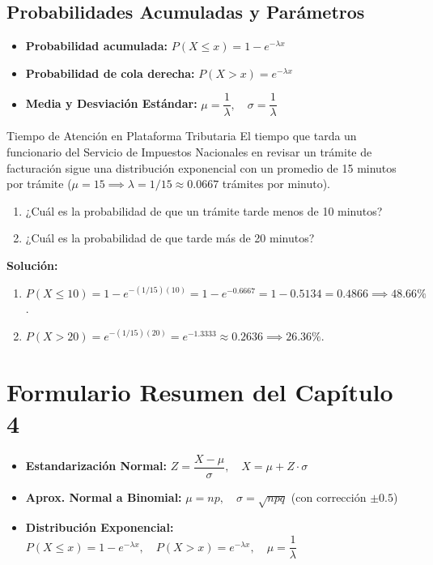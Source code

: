 \subsection{Probabilidades Acumuladas y Parámetros}
\begin{itemize}
    \item \textbf{Probabilidad acumulada:} $P(X \le x) = 1 - e^{-\lambda x}$
    \item \textbf{Probabilidad de cola derecha:} $P(X > x) = e^{-\lambda x}$
    \item \textbf{Media y Desviación Estándar:} $\mu = \dfrac{1}{\lambda}, \quad \sigma = \dfrac{1}{\lambda}$
\end{itemize}

\begin{ejemplo}{Tiempo de Atención en Plataforma Tributaria}
El tiempo que tarda un funcionario del Servicio de Impuestos Nacionales en revisar un trámite de facturación sigue una distribución exponencial con un promedio de 15 minutos por trámite ($\mu = 15 \implies \lambda = 1/15 \approx 0.0667$ trámites por minuto).
\begin{enumerate}[label=\alph*)]
    \item ¿Cuál es la probabilidad de que un trámite tarde menos de 10 minutos?
    \item ¿Cuál es la probabilidad de que tarde más de 20 minutos?
\end{enumerate}

\tcbline
\textbf{Solución:}
\begin{enumerate}[label=\alph*)]
    \item $P(X \le 10) = 1 - e^{-(1/15)(10)} = 1 - e^{-0.6667} = 1 - 0.5134 = 0.4866 \implies 48.66\%$.
    \item $P(X > 20) = e^{-(1/15)(20)} = e^{-1.3333} \approx 0.2636 \implies 26.36\%$.
\end{enumerate}
\end{ejemplo}

\section{Formulario Resumen del Capítulo 4}
\begin{formulario}
\begin{itemize}
    \item \textbf{Estandarización Normal:} $Z = \dfrac{X - \mu}{\sigma}, \quad X = \mu + Z \cdot \sigma$
    \item \textbf{Aprox. Normal a Binomial:} $\mu = np, \quad \sigma = \sqrt{npq}$ (con corrección $\pm 0.5$)
    \item \textbf{Distribución Exponencial:} $P(X \le x) = 1 - e^{-\lambda x}, \quad P(X > x) = e^{-\lambda x}, \quad \mu = \dfrac{1}{\lambda}$
\end{itemize}
\end{formulario}

